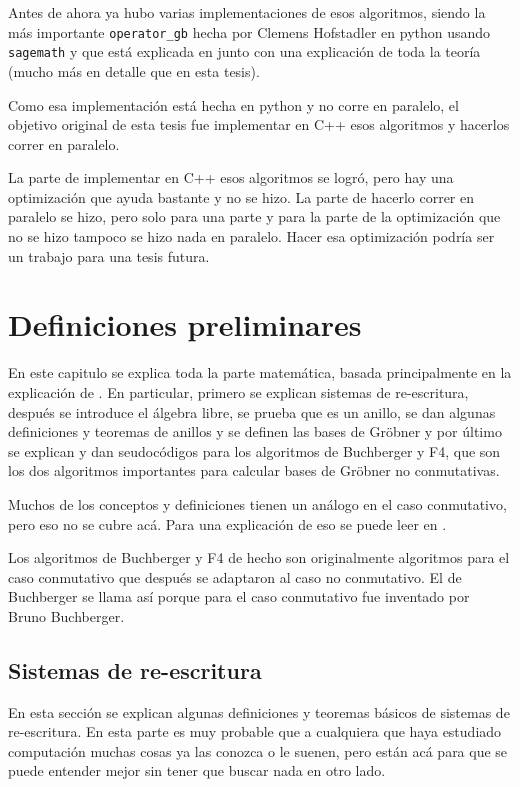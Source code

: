 \documentclass[12pt]{report}
\theoremstyle{customstyle}
\theoremstyle{factstyle}
\begin{document}
Antes de ahora ya hubo varias implementaciones de esos algoritmos, siendo la más importante \texttt{operator\_gb} hecha por Clemens Hofstadler en python usando \texttt{sagemath} y que está explicada en \cite{thesis:Hof20} junto con una explicación de toda la teoría (mucho más en detalle que en esta tesis).

Como esa implementación está hecha en python y no corre en paralelo, el objetivo original de esta tesis fue implementar en C++ esos algoritmos y hacerlos correr en paralelo.

La parte de implementar en C++ esos algoritmos se logró, pero hay una optimización que ayuda bastante y no se hizo. La parte de hacerlo correr en paralelo se hizo, pero solo para una parte y para la parte de la optimización que no se hizo tampoco se hizo nada en paralelo. Hacer esa optimización podría ser un trabajo para una tesis futura.

\chapter{Definiciones preliminares}\label{cap:Definiciones preliminares}

En este capitulo se explica toda la parte matemática, basada principalmente en la explicación de \cite{thesis:Hof20}. En particular, primero se explican sistemas de re-escritura, después se introduce el álgebra libre, se prueba que es un anillo, se dan algunas definiciones y teoremas de anillos y se definen las bases de Gröbner y por último se explican y dan seudocódigos para los algoritmos de Buchberger y F4, que son los dos algoritmos importantes para calcular bases de Gröbner no conmutativas.

Muchos de los conceptos y definiciones tienen un análogo en el caso conmutativo, pero eso no se cubre acá. Para una explicación de eso se puede leer en \cite{book:ideals-varieties-algorithms}.

Los algoritmos de Buchberger y F4 de hecho son originalmente algoritmos para el caso conmutativo que después se adaptaron al caso no conmutativo. El de Buchberger se llama así porque para el caso conmutativo fue inventado por Bruno Buchberger.

\section{Sistemas de re-escritura}

En esta sección se explican algunas definiciones y teoremas básicos de sistemas de re-escritura. En esta parte es muy probable que a cualquiera que haya estudiado computación muchas cosas ya las conozca o le suenen, pero están acá para que se puede entender mejor sin tener que buscar nada en otro lado.
\end{document}
